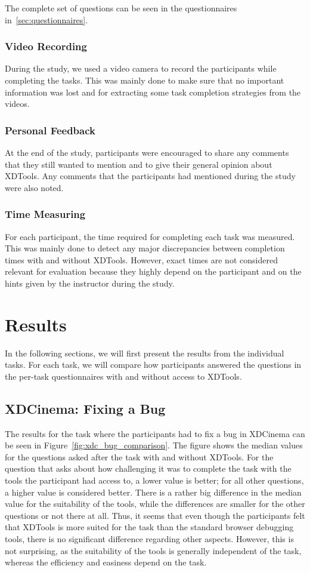 The complete set of questions can be seen in the questionnaires in~\ref{sec:questionnaires}.

\subsubsection{Video Recording}
During the study, we used a video camera to record the participants while completing the tasks. This was mainly done to make sure that no important information was lost and for extracting some task completion strategies from the videos.

\subsubsection{Personal Feedback}
At the end of the study, participants were encouraged to share any comments that they still wanted to mention and to give their general opinion about XDTools. Any comments that the participants had mentioned during the study were also noted.

\subsubsection{Time Measuring}
For each participant, the time required for completing each task was measured. This was mainly done to detect any major discrepancies between completion times with and without XDTools. However, exact times are not considered relevant for evaluation because they highly depend on the participant and on the hints given by the instructor during the study.

\section{Results}

In the following sections, we will first present the results from the individual tasks. For each task, we will compare how participants answered the questions in the per-task questionnaires with and without access to XDTools. 

\subsection{XDCinema: Fixing a Bug}

The results for the task where the participants had to fix a bug in XDCinema can be seen in Figure~\ref{fig:xdc_bug_comparison}. The figure shows the median values for the questions asked after the task with and without XDTools. For the question that asks about how challenging it was to complete the task with the tools the participant had access to, a lower value is better; for all other questions, a higher value is considered better. There is a rather big difference in the median value for the suitability of the tools, while the differences are smaller for the other questions or not there at all. Thus, it seems that even though the participants felt that XDTools is more suited for the task than the standard browser debugging tools, there is no significant difference regarding other aspects. However, this is not surprising, as the suitability of the tools is generally independent of the task, whereas the efficiency and easiness depend on the task. 

